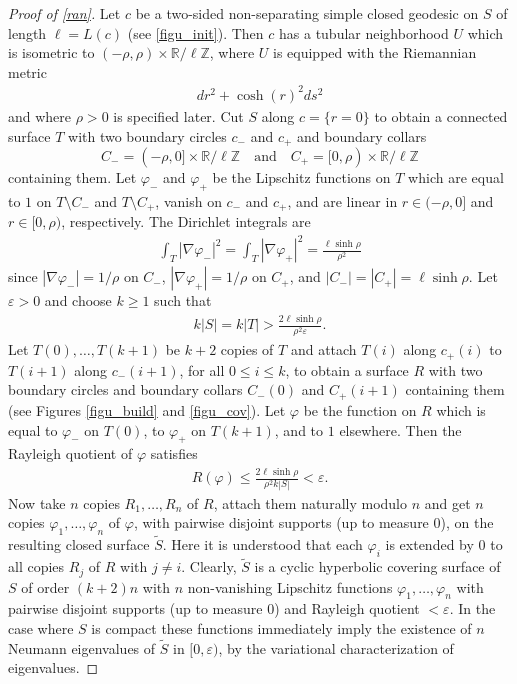\documentclass[a4paper,11pt]{amsart}
\numberwithin{equation}{section}
\theoremstyle{definition}
\def\R{\mathbb R}
\def\Z{\mathbb Z}
\def\ve{\varepsilon}
\def\vf{\varphi}
\begin{document}
\begin{proof}[Proof of \cref{ran}]
Let $c$ be a two-sided non-separating simple closed geodesic on $S$ of length $\ell=L(c)$ (see \cref{figu_init}).
Then $c$ has a tubular neighborhood $U$ which is isometric to $(-\rho,\rho)\times\R/\ell\Z$,
where $U$ is equipped with the Riemannian metric
\begin{align*}
  dr^2 + \cosh(r)^2ds^2
\end{align*}
and where $\rho>0$ is specified later. 
Cut $S$ along $c=\{r=0\}$ to obtain a connected surface $T$ with two boundary circles $c_-$ and $c_+$ and boundary collars \[C_-=(-\rho,0]\times\R/\ell\Z\quad\text{and}\quad C_+=[0,\rho)\times\R/\ell\Z\] containing them.
Let $\vf_-$ and $\vf_+$ be the Lipschitz functions on $T$ which are equal to $1$ on $T\setminus C_-$ and $T\setminus C_+$, vanish on $c_-$ and $c_+$, and are linear in $r\in(-\rho,0]$ and $r\in[0,\rho)$, respectively.
The Dirichlet integrals are
\begin{align*}
  \int_{T}|\nabla\vf_-|^2 = \int_{T}|\nabla\vf_+|^2 = \frac{\ell\sinh\rho}{\rho^2}
\end{align*}
since $|\nabla\vf_-|=1/\rho$ on $C_-$, $|\nabla\vf_+|=1/\rho$ on $C_+$, and $|C_-|=|C_+|=\ell\sinh\rho$.
Let $\ve>0$ and choose $k\ge1$ such that
\begin{align}\label{ksuf}
  k|S| = k|T| > \frac{2\ell\sinh\rho}{\rho^2\ve}.
\end{align}
Let $T(0),\dots,T(k+1)$ be $k+2$ copies of $T$ and attach $T(i)$ along $c_+(i)$ to $T(i+1)$ along $c_-(i+1)$,
for all $0\le i\le k$, to obtain a surface $R$ with two boundary circles and boundary collars $C_-(0)$ and $C_+(i+1)$ containing them (see Figures \ref{figu_build} and \ref{figu_cov}).
Let $\vf$ be the function on $R$ which is equal to $\vf_-$ on $T(0)$, to $\vf_+$ on $T(k+1)$, and to $1$ elsewhere.
Then the Rayleigh quotient of $\vf$ satisfies
\begin{align*}
  R(\vf) \le \frac{2\ell\sinh\rho}{\rho^2k|S|} < \ve.
\end{align*}
Now take $n$ copies $R_1,\dots,R_n$ of $R$, attach them naturally modulo $n$ and get $n$ copies $\vf_1,\dots,\vf_n$ of $\vf$, with pairwise disjoint supports (up to measure $0$), on the resulting closed surface $\tilde S$.
Here it is understood that each $\vf_i$ is extended by $0$ to all copies $R_j$ of $R$ with $j\ne i$.
Clearly, $\tilde S$ is a cyclic hyperbolic covering surface of $S$ of order $(k+2)n$ with $n$ non-vanishing Lipschitz functions $\vf_1,\dots,\vf_n$ with pairwise disjoint supports (up to measure $0$) and Rayleigh quotient $<\ve$.
In the case where $S$ is compact these functions immediately imply the existence of $n$ Neumann eigenvalues of $\tilde S$ in $[0,\ve)$, by the variational characterization of eigenvalues.


\end{proof}
\end{document}
